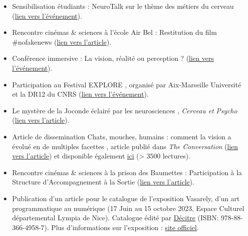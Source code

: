 \documentclass[10pt,french,a4paper]{article}%
\begin{document}
\begin{itemize}

    \item Sensibilisation étudiants : \og NeuroTalk sur le thème des métiers du cerveau \fg{} (\href{https://laurentperrinet.github.io/post/2025-11-24_neurotalk/}{lien vers l'événement}).

	\item Rencontre cinémas \& sciences à l'école Air Bel : Restitution du film \og \#nofakenews \fg{} (\href{https://laurentperrinet.github.io/post/2025-09-23_belair-nofakenews/}{lien vers l'article}).

    \item Conférence immersive : \og La vision, réalité ou perception ? \fg{} (\href{https://laurentperrinet.github.io/talk/2025-06-12_explore-conference-immersive}{lien vers l'événement}).
	
	\item Participation au \og Festival EXPLORE \fg{}, organisé par Aix-Marseille Université et la DR12 du CNRS (\href{https://laurentperrinet.github.io/talk/2025-06-10_explore-cine-sciences}{lien vers l'événement}).

    \item \og Le mystère de la Joconde éclairé par les neurosciences \fg{}, \textit{Cerveau et Psycho} (\href{https://laurentperrinet.github.io/post/2024-08-25-joconde/}{lien vers l'article}).

    \item Article de dissemination \og Chats, mouches, humains : comment la vision a évolué en de multiples facettes \fg{}, article publié dans \textit{The Conversation} (\href{https://theconversation.com/le-jeu-du-cerveau-et-du-hasard-159388}{lien vers l'article}) et disponible également \href{https://laurentperrinet.github.io/publication/perrinet-24-yeux/}{ici}  (> $3500$ lectures).

    \item Rencontre cinémas \& sciences à la prison des Baumettes : Participation à la \og Structure d’Accompagnement à la Sortie \fg{} (\href{https://laurentperrinet.github.io/post/2024-05-23-lieux-fictifs/}{lien vers l'article}).

    \item Publication d’un article pour le catalogue de l’exposition \og Vasarely, d’un art programmatique au numérique \fg{} (17 Juin au 15 octobre 2023, Espace Culturel départemental Lympia de Nice). Catalogue édité par \href{https://www.decitre.fr/livres/vasarely-9788836649587.html}{Décitre} (ISBN: 978-88-366-4958-7). Plus d’informations sur l’exposition : \href{https://www.departement06.fr/culture/vasarely-d-un-art-programmatique-au-numerique-13667.html}{site officiel}.


\end{itemize}
\end{document}
